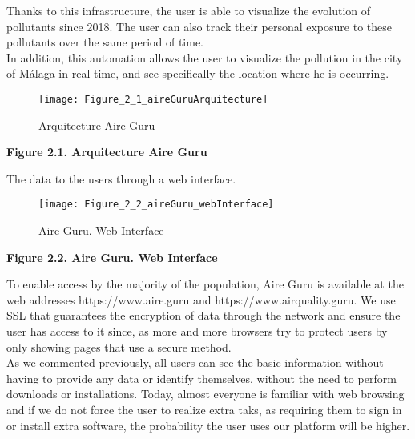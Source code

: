 Thanks to this infrastructure, the user is able to visualize the evolution of pollutants since 2018. The user can also track their personal exposure
 to these pollutants over the same period of time.\\

In addition, this automation allows the user to visualize the pollution in the city of Málaga in real time, and see specifically the location where he is 
occurring. \\

\begin{figure}[ht]
    \centering
    \texttt{[image: Figure\_2\_1\_aireGuruArquitecture]}
    \caption{Arquitecture Aire Guru}

\end{figure}

\begin{center}
\bf Figure 2.1. Arquitecture Aire Guru\\
\end{center}
The data to the users through a web interface. \\

\begin{figure}[ht]
    \centering
    \texttt{[image: Figure\_2\_2\_aireGuru\_webInterface]}
    \caption{Aire Guru. Web Interface}
\end{figure}
\begin{center}
    \bf Figure 2.2. Aire Guru. Web Interface\\
    \end{center}
To enable access by the majority of the population, Aire Guru is available at the web addresses https://www.aire.guru and https://www.airquality.guru.
We use SSL that guarantees the encryption of data through the network and ensure the user has access to it since, as more and more browsers try to protect 
users by only showing pages that use a secure method.\\

As we commented previously, all users can see the basic information without having to provide any data or identify themselves, without the need to
perform downloads or installations. Today, almost everyone is familiar with web browsing and if we do not force the user to realize extra taks, as 
requiring them to sign in or install extra software, the probability the user uses our platform will be higher. 

